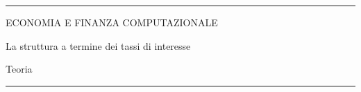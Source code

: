 \documentclass[12pt,aspectratio=169]{beamer}
\begin{document}
\begin{frame}
\unitlength 5mm

\begin{center}

\rule{\textwidth}{2pt}

\vskip3mm
ECONOMIA E FINANZA COMPUTAZIONALE

La struttura a termine dei tassi di interesse

Teoria
\rule{\textwidth}{2pt}

\end{center}

\end{frame}


\end{document}
